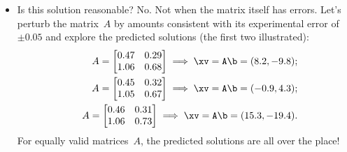 \begin{example}
\begin{solution}
\begin{itemize}
\item Is this solution reasonable?  No.  Not when the matrix itself has errors.
Let's perturb the matrix~\(A\) by amounts consistent with its experimental error of~\(\pm0.05\) and explore the predicted solutions (the first two illustrated):
%
%
\begin{eqnarray*}
&&A=\begin{bmatrix} 0.47&0.29\\1.06&0.68 \end{bmatrix}
\implies \xv=\verb|A\b|=(8.2,-9.8);
\\&&A=\begin{bmatrix} 0.45&0.32\\1.05&0.67 \end{bmatrix}
\implies \xv=\verb|A\b|=(-0.9,4.3);
\\&&A=\begin{bmatrix} 0.46&0.31\\1.06&0.73 \end{bmatrix}
\implies \xv=\verb|A\b|=(15.3,-19.4).
\end{eqnarray*}
For equally valid matrices~\(A\), the predicted solutions are all over the place!



\end{itemize}
\end{solution}
\end{example}
